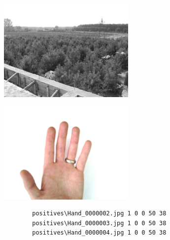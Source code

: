 \documentclass[11pt]{article}
\begin{document}
\begin{minipage}[t]{0.5\textwidth}
    \begin{center}
        \includegraphics[width=0.5\textwidth]{images/ex_neg.jpg}
        \label{fig:ex_neg}
    \end{center}
\end{minipage}
\begin{minipage}[t]{0.45\textwidth}
    \begin{center}
        \includegraphics[width=0.5\textwidth]{images/ex_pos.jpg}
        \label{fig:ex_pos}
    \end{center}
\end{minipage}

\bigbreak \bigbreak \bigbreak

\begin{center}
    \begin{verbatim}
        positives\Hand_0000002.jpg 1 0 0 50 38
        positives\Hand_0000003.jpg 1 0 0 50 38
        positives\Hand_0000004.jpg 1 0 0 50 38
    \end{verbatim}
    \label{fig:ex_desc}
\end{center}


\bigbreak \bigbreak
\end{document}
